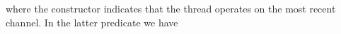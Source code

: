 \begin{AgdaAlign}
\begin{code}%
%
\>[2]\AgdaSpace{}%
\AgdaSymbol{:}\AgdaSpace{}%
\AgdaSpace{}%
\AgdaSymbol{\}}\AgdaSpace{}%
\AgdaSymbol{(}\AgdaSpace{}%
\AgdaSymbol{:}\AgdaSpace{}%
\AgdaSpace{}%
\AgdaSpace{}%
\AgdaInductiveConstructor{[]}\AgdaSpace{}%
\AgdaOperator{\AgdaDatatype{+}}\AgdaSpace{}%
\AgdaSymbol{)}\AgdaSpace{}%
\AgdaSymbol{\{}\AgdaSpace{}%
\AgdaSymbol{:}\AgdaSpace{}%
\AgdaSpace{}%
\AgdaSymbol{\}}\AgdaSpace{}%
\AgdaSpace{}%
\AgdaSpace{}%
\AgdaSymbol{(}\AgdaSpace{}%
\AgdaSymbol{(}\AgdaSpace{}%
\AgdaSymbol{)}\AgdaSpace{}%
\AgdaSymbol{)}\<%
\end{code}
where the  constructor indicates that the
thread operates on the most recent channel. In the latter predicate we have


\end{AgdaAlign}
